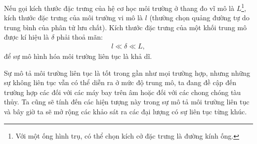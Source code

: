 \documentclass[../../../main.tex]{subfiles}
\begin{document}
    Nếu gọi kích thước đặc trưng của hệ cơ học môi trường ở thang đo vĩ mô là $L$\footnote{Với một ống hình trụ, có thể chọn kích cở đặc trưng là đường kính ống.}, kích thước đặc trưng của môi trường vi mô là $l$ (thường chọn quảng đường tự do trung bình của phân tử lưu chất). Kích thước đặc trưng của một khối trung mô được kí hiệu là $\delta$ phải thoả mãn:
        \begin{align}
            l\ll\delta\ll L,
        \end{align}
    để sự mô hình hóa môi trường liên tục là khả dĩ.

    Sự mô tả môi trường liên tục là tốt trong gần như mọi trường hợp, nhưng những sự không liên tục vẫn có thể diễn ra ở mức độ trung mô, ta đang đề cập đến trường hợp các  đối với các máy bay trên âm hoặc  đối với các chong chóng tàu thủy. Ta cũng sẽ tính đến các hiện tượng này trong sự mô tả môi trường liên tục và bây giờ ta sẽ mở rộng các khảo sát ra các đại lượng có sự liên tục từng khúc.
\end{document}
